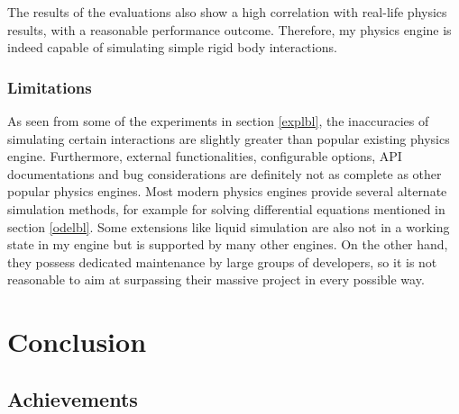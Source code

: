 \documentclass[12pt,a4paper,twoside,openright]{report}
\begin{document}
\begin{figure}
    \captionsetup{labelsep=none}
    \caption{}
    \label{sc2}
  \end{figure}

The results of the evaluations also show a high correlation with real-life physics results, with a reasonable performance outcome. Therefore, my physics engine is indeed capable of simulating simple rigid body interactions.

\subsection{Limitations}

As seen from some of the experiments in section \ref{explbl}, the inaccuracies of simulating certain interactions are slightly greater than popular existing physics engine. Furthermore, external functionalities, configurable options, API documentations and bug considerations are definitely not as complete as other popular physics engines. Most modern physics engines provide several alternate simulation methods, for example for solving differential equations mentioned in section \ref{odelbl}. Some extensions like liquid simulation are also not in a working state in my engine but is supported by many other engines. On the other hand, they possess dedicated maintenance by large groups of developers, so it is not reasonable to aim at surpassing their massive project in every possible way.

\chapter{Conclusion}\label{chap5}

\section{Achievements}
\end{document}
